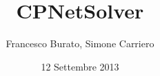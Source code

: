 \documentclass[xcolor=dvipsnames]{beamer}
\title{CPNetSolver}
\author{Francesco Burato, Simone Carriero}
\institute[UNIPD]{
  Dipartimento di Matematica\\
  Università degli Studi di Padova\\[1ex]
}
\date{12 Settembre 2013}
\begin{document}
\begin{frame}[plain]
  \titlepage
\end{frame}




\end{document}
